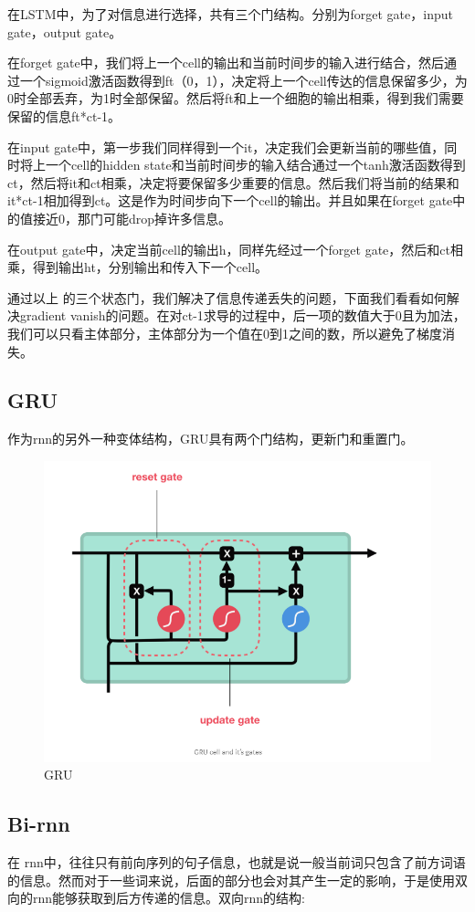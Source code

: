 \documentclass{article}
\begin{document}
在LSTM中，为了对信息进行选择，共有三个门结构。分别为forget gate，input gate，output gate。

在forget gate中，我们将上一个cell的输出和当前时间步的输入进行结合，然后通过一个sigmoid激活函数得到ft（0，1），决定将上一个cell传达的信息保留多少，为0时全部丢弃，为1时全部保留。然后将ft和上一个细胞的输出相乘，得到我们需要保留的信息ft*ct-1。

在input gate中，第一步我们同样得到一个it，决定我们会更新当前的哪些值，同时将上一个cell的hidden state和当前时间步的输入结合通过一个tanh激活函数得到ct，然后将it和ct相乘，决定将要保留多少重要的信息。然后我们将当前的结果和it*ct-1相加得到ct。这是作为时间步向下一个cell的输出。并且如果在forget gate中的值接近0，那门可能drop掉许多信息。

在output gate中，决定当前cell的输出h，同样先经过一个forget gate，然后和ct相乘，得到输出ht，分别输出和传入下一个cell。

通过以上 的三个状态门，我们解决了信息传递丢失的问题，下面我们看看如何解决gradient vanish的问题。在对ct-1求导的过程中，后一项的数值大于0且为加法，我们可以只看主体部分，主体部分为一个值在0到1之间的数，所以避免了梯度消失。


\subsection{GRU}

作为rnn的另外一种变体结构，GRU具有两个门结构，更新门和重置门。

\begin{figure}
  \centering
  \includegraphics[width=.8\textwidth]{GRU.png} %
  \caption{GRU}
  \label{fig:fig1}
\end{figure}


\subsection{Bi-rnn}
在 rnn中，往往只有前向序列的句子信息，也就是说一般当前词只包含了前方词语的信息。然而对于一些词来说，后面的部分也会对其产生一定的影响，于是使用双向的rnn能够获取到后方传递的信息。双向rnn的结构:
\end{document}
